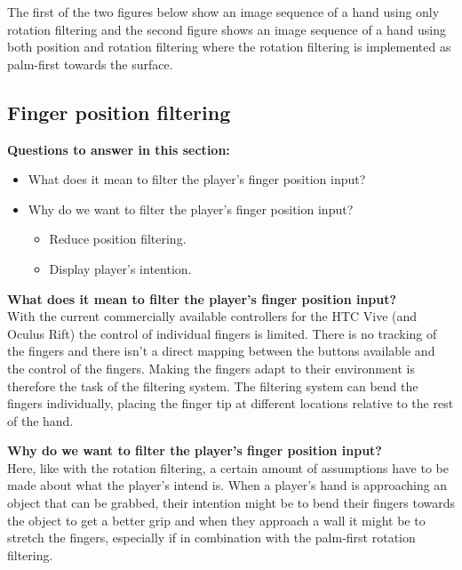 The first of the two figures below show an image sequence of a hand using only rotation filtering and the second figure shows an image sequence of a hand using both position and rotation filtering where the rotation filtering is implemented as palm-first towards the surface.


\subsection{Finger position filtering}
\label{subsec:categoryFingerFiltering}
\textbf{Questions to answer in this section:}
\begin{itemize}
\item What does it mean to filter the player's finger position input?
\item Why do we want to filter the player's finger position input?
\begin{itemize}
\item Reduce position filtering.
\item Display player's intention.
\end{itemize}
\end{itemize}

\textbf{What does it mean to filter the player's finger position input?}\\
With the current commercially available controllers for the HTC Vive (and Oculus Rift) the control of individual fingers is limited. There is no tracking of the fingers and there isn't a direct mapping between the buttons available and the control of the fingers. Making the fingers adapt to their environment is therefore the task of the filtering system. The filtering system can bend the fingers individually, placing the finger tip at different locations relative to the rest of the hand.

\textbf{Why do we want to filter the player's finger position input?}\\
Here, like with the rotation filtering, a certain amount of assumptions have to be made about what the player's intend is. When a player's hand is approaching an object that can be grabbed, their intention might be to bend their fingers towards the object to get a better grip and when they approach a wall it might be to stretch the fingers, especially if in combination with the palm-first rotation filtering.

